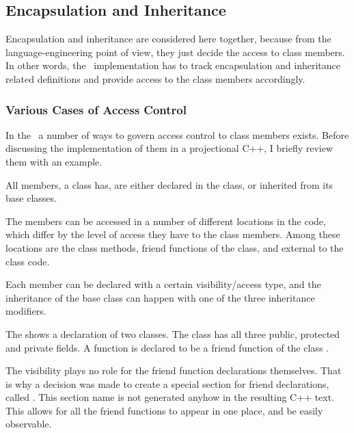 \subsection{Encapsulation and Inheritance}


Encapsulation and inheritance are considered here together, because from the language-engineering point of view, 
they just decide the access to class members. In other words, the \pcpp\ implementation has to track
encapsulation and inheritance related definitions and provide access to the class members accordingly.


\subsubsection{Various Cases of Access Control}

In the \cpppl\ a number of ways to govern access control to class members exists. Before discussing 
the implementation of them in a projectional C++, I briefly review them with an example.

All members, a class has, are either declared in the class, or inherited from its base classes. 

The members can be accessed in a number of different locations in the code, which differ by the level of access they have
to the class members. Among these locations are the class methods, friend functions of the class, and
external to the class code. 

Each member can be declared with a certain visibility/access type, and the inheritance
of the base class can happen with one of the three inheritance modifiers. 



The  shows a declaration of two classes. The class  has all three
public, protected and private fields. A function  is declared to be a
friend function of  the class . 

The visibility plays no role for the friend function 
declarations themselves. That is why a decision was made to create a special 
section for friend declarations, called . This section name is not generated anyhow in the 
resulting C++ text. This allows for all the friend functions to appear in one place, 
and be easily observable.

